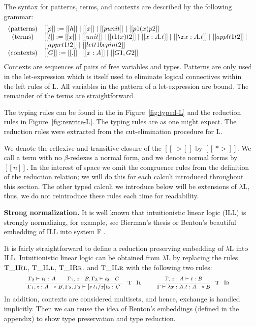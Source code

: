\documentclass{entcs}
\begin{document}
The syntax for patterns, terms, and contexts are described by the
following grammar:
\vspace{-10px}
\[
\begin{array}{cll}
  \text{(patterns)} & [[p]] := [[h]] \mid [[x]] \mid [[punit]] \mid [[p1 (x) p2]]\\
  \text{(terms)}    & [[t]] := [[x]] \mid [[unit]] \mid [[t1 (x) t2]] \mid [[\l x : A.t]] \mid [[\r x : A.t]] \mid
  [[appl t1 t2]] \mid \\ & [[appr t1 t2]] \mid [[let t1 be p in t2]]\\
  \text{(contexts)} & [[G]] := [[.]] \mid [[x : A]] \mid [[G1,G2]]\\
\end{array}
\vspace{-10px}
\]
Contexts are sequences of pairs of free variables and types.  Patterns
are only used in the let-expression which is itself used to eliminate
logical connectives within the left rules of L.  All variables in the
pattern of a let-expression are bound.  The remainder of the terms are
straightforward.

The typing rules can be found in the in Figure~\ref{fig:typed-L} and
the reduction rules in Figure~\ref{fig:rewrite-L}. The typing rules
are as one might expect.  The reduction rules were extracted from the
cut-elimination procedure for L.

We denote the reflexive and transitive closure of the $[[~>]]$ by
$[[~*>]]$.  We call a term with no $\beta$-redexes a normal form,
and we denote normal forms by $[[n]]$.  In the interest of space we
omit the congruence rules from the definition of the reduction
relation; we will do this for each calculi introduced throughout this
section.  The other typed calculi we introduce below will be
extensions of $\lambda\text{L}$, thus, we do not reintroduce these
rules each time for readability.

\textbf{Strong normalization.}  It is well known that intuitionistic
linear logic (ILL) is strongly normalizing, for example, see Bierman's
thesis \cite{Bierman:1994} or Benton's beautiful embedding of ILL into
system F \cite{Benton:1995c}.  

It is fairly straightforward to define a reduction preserving
embedding of $\lambda\text{L}$ into ILL.  Intuitionistic linear logic
can be obtained from $\lambda\text{L}$ by replacing the rules
$\textsc{T\_IRl}$, $\textsc{T\_ILl}$, $\textsc{T\_IRr}$,
and $\textsc{T\_ILr}$ with the following two rules:
\[ \small
\begin{array}{cccccccc} 
  \LdruleTXXIl{} & \quad \LdruleTXXIr{}
\end{array}
\]
In addition, contexts are considered multisets, and hence, exchange is
handled implicitly. Then we can reuse the idea of Benton's embeddings
(defined in the appendix) to show type preservation and type
reduction.
\end{document}
